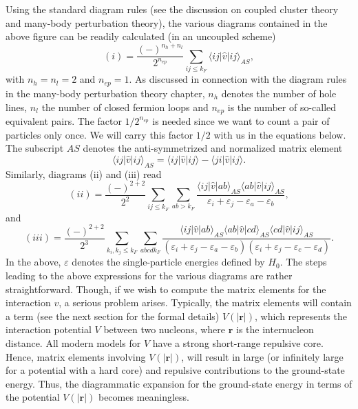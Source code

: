 Using the standard diagram rules (see the discussion on
coupled cluster theory and many-body perturbation theory), the various
diagrams contained in the above figure can be readily calculated (in
an uncoupled scheme)
\begin{equation}
   (i)=\frac{(-)^{n_h+n_l}}{2^{n_{ep}}}\sum_{ij\leq k_F}
       \langle ij\vert\hat{v}\vert ij\rangle_{AS},
\end{equation}
with $n_h=n_l=2$ and $n_{ep}=1$. As discussed in connection with the
diagram rules in the many-body perturbation theory chapter, $n_h$
denotes the number of hole lines, $n_l$ the number of closed fermion
loops and $n_{ep}$ is the number of so-called equivalent pairs.  The
factor $1/2^{n_{ep}}$ is needed since we want to count a pair of
particles only once. We will carry this factor $1/2$ with us in the
equations below.  The subscript $AS$ denotes the anti-symmetrized and
normalized matrix element
\begin{equation}
     \langle ij\vert\hat{v}\vert ij\rangle_{AS}=\langle ij \vert\hat{v}\vert ij\rangle-
     \langle ji \vert\hat{v}\vert ij\rangle.
\end{equation}
Similarly, diagrams (ii) and (iii) read
\begin{equation}
   (ii)=\frac{(-)^{2+2}}{2^2}\sum_{ij\leq k_F}\sum_{ab>k_F}
   \frac{\langle ij\vert\hat{v}\vert ab\rangle_{AS}
   \langle ab\vert\hat{v}\vert ij\rangle_{AS}}
   {\varepsilon_i+\varepsilon_j-\varepsilon_a-\varepsilon_b},
\end{equation}
and
\begin{equation}
   (iii)=\frac{(-)^{2+2}}{2^3}\sum_{k_i,k_j\leq k_F}\sum_{abcdk_F}
   \frac{\langle ij\vert\hat{v}\vert ab\rangle_{AS}
   \langle ab\vert\hat{v}\vert cd\rangle_{AS}
   \langle cd\vert\hat{v}\vert ij\rangle_{AS}}
   {(\varepsilon_i+\varepsilon_j-\varepsilon_a-\varepsilon_b)
   (\varepsilon_i+\varepsilon_j-\varepsilon_c-\varepsilon_d)}.
\end{equation}
In the above, $\varepsilon$ denotes the single-particle  energies defined by
$H_0$.
The steps leading to the above expressions for the various
diagrams are rather straightforward. Though, if we wish to compute the
matrix elements for the interaction $v$, a serious problem
arises. Typically, the matrix elements will contain a term
(see the next section for the formal details) $V(|{\mathbf r}|)$, which
represents the interaction potential $V$ between two nucleons, where
${\mathbf r}$ is the internucleon distance.
All modern models
for $V$ have a strong short-range repulsive core. Hence,
matrix elements involving $V(|{\mathbf r}|)$, will result in large
(or infinitely large for a potential with a hard core)
and repulsive contributions to the ground-state energy. Thus, the
diagrammatic expansion for the ground-state energy in terms of the
potential $V(|{\mathbf r}|)$ becomes meaningless.

